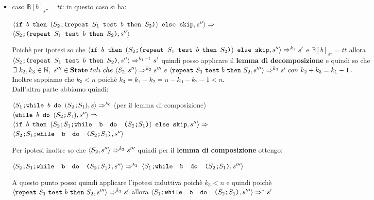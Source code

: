 {\begin{itemize}
\begin{center}
		$\confSs{\wbS{b}{(\concat{$S_2$}{$S_1$})}}{s''}$
		\end{center}
		Poichè per ipotesi sappiamo che $\confSs{S_1}{s}\Rar{k_0}s''$. Inoltre
		sempre per ipotesi abbiamo che $\mathbb{B}[b]_{s''}=ff$, quindi:
		\begin{center}
		$\confSs{\wbS{b}{(\concat{$S_2$}{$S_1$})}}{s''}\Rar{}$\\
		$\confSs{\ifABC{b}{(\concat{$S_2$}{(\concat{$S_1$}
		{\wbS{b}{(\concat{$S_2$}{$S_1$})}})})}{\skipistr}}{s''}\Rar{}$\\
		$\confSs{\skipistr}{s''}\Rar{}s''$
		\end{center}
		Ottenedo lo stesso stato finale quindi dell'implicazione di partenza.

		\item caso $\mathbb{B}[b]_{s''}=tt$: in questo caso si ha:
		\begin{center}
		$\confSs{\ifABC{b}{(\concat{$S_2$}{(\repeatSbS{$S_1$}{$b$}{$S_2$})})}
		{\skipistr}}{s''}\Rar{}$\\
		$\confSs{\concat{$S_2$}{(\repeatSbS{$S_1$}{$b$}{$S_2$})}}{s''}$\\
		\end{center}
		Poichè per ipotesi so che $\confSs{\ifABC{b}{(\concat{$S_2$}
		{(\repeatSbS{$S_1$}{$b$}{$S_2$})})}{\skipistr}}{s''}\Rar{k_1}s'$ e 
		$\mathbb{B}[b]_{s''}=tt$ allora 
		$\confSs{\concat{$S_2$}{(\repeatSbS{$S_1$}{$b$}{$S_2$})}}{s''}
		\Rar{k_1-1}s'$ quindi posso applicare il \textbf{lemma di 
		decomposizione} e quindi so che $\exists{}~k_2,k_3\in{}\mathbb{N},~
		s'''\in{}\states{}~tali~che~\confSs{S_2}{s''}\Rar{k_2}s'''~e
		~\confSs{\repeatSbS{S_1}{b}{S_2}}{s'''}\Rar{k_3}s'~con~
		k_2+k_3=k_1-1$.\\
		Inoltre sappiamo che $k_3<n$ poichè $k_3=k_1-k_2=n-k_0-k_2-1<n$.\\
		Dall'altra parte abbiamo quindi:
		\begin{center}
		$\confSs{\PDef{}}{s}\Rar{k_0}$ (per il lemma di composizione)\\
		$\confSs{\wbS{b}{(\concat{$S_2$}{$S_1$})}}{s''}\Rar{}$\\
		$\confSs{\ifABC{b}{(\concat{\concat{$S_2$}{$S_1$}}
		{\wbS{b}{(\concat{$S_2$}{$S_1$})}})}{\skipistr}}{s''}\Rar{}$\\
		$\confSs{\concat{\concat{$S_2$}{$S_1$}}
		{\wbS{b}{(\concat{$S_2$}{$S_1$})}}}{s''}$
		\end{center}
		Per ipotesi inoltre so che $\confSs{S_2}{s''}\Rar{k_2}s'''$ quindi per
		il \textbf{lemma di composizione} ottengo:
		\begin{center}
		$\confSs{\concat{\concat{$S_2$}{$S_1$}}
		{\wbS{b}{(\concat{$S_2$}{$S_1$})}}}{s''}\Rar{k_2}$
		$\confSs{\concat{$S_1$}{\wbS{b}{(\concat{$S_2$}{$S_1$})}}}{s'''}$
		\end{center}
		A questo punto posso quindi applicare l'ipotesi induttiva poichè $k_3<n$
		e quindi poichè \\$\confSs{\repeatSbS{S_1}{b}{S_2}}{s'''}\Rar{k_3}s'$
		allora $\confSs{\concat{$S_1$}{\wbS{b}{(\concat{$S_2$}{$S_1$})}}}{s'''}
		\Rar{*}s'$

	\end{itemize}
}